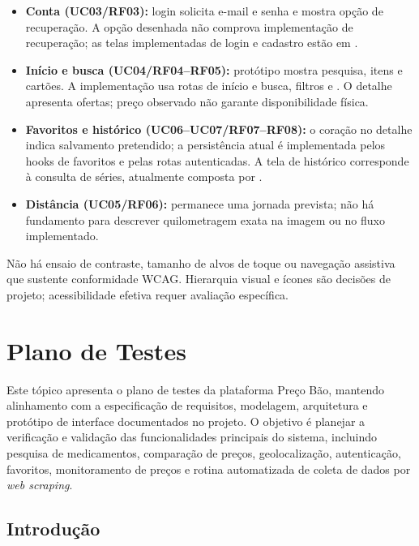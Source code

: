 \begin{itemize}
\item \textbf{Conta (UC03/RF03):} login solicita e-mail e senha e mostra opção de recuperação. A opção desenhada não comprova implementação de recuperação; as telas implementadas de login e cadastro estão em .
\item \textbf{Início e busca (UC04/RF04--RF05):} protótipo mostra pesquisa, itens e cartões. A implementação usa rotas de início e busca, filtros e . O detalhe apresenta ofertas; preço observado não garante disponibilidade física.
\item \textbf{Favoritos e histórico (UC06--UC07/RF07--RF08):} o coração no detalhe indica salvamento pretendido; a persistência atual é implementada pelos hooks de favoritos e pelas rotas autenticadas. A tela de histórico corresponde à consulta de séries, atualmente composta por .
\item \textbf{Distância (UC05/RF06):} permanece uma jornada prevista; não há fundamento para descrever quilometragem exata na imagem ou no fluxo implementado.
\end{itemize}

Não há ensaio de contraste, tamanho de alvos de toque ou navegação assistiva que sustente conformidade WCAG. Hierarquia visual e ícones são decisões de projeto; acessibilidade efetiva requer avaliação específica.

\FloatBarrier
\section{Plano de Testes} %

Este tópico apresenta o plano de testes da plataforma Preço Bão, mantendo alinhamento com a especificação de requisitos, modelagem, arquitetura e protótipo de interface documentados no projeto. O objetivo é planejar a verificação e validação das funcionalidades principais do sistema, incluindo pesquisa de medicamentos, comparação de preços, geolocalização, autenticação, favoritos, monitoramento de preços e rotina automatizada de coleta de dados por \textit{web scraping}.

\subsection{Introdução} %

